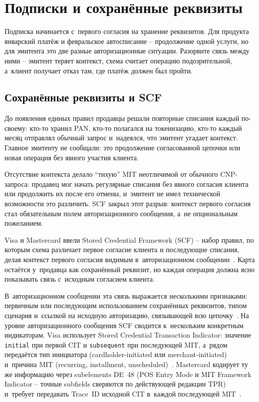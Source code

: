 
\chapter{Подписки и сохранённые реквизиты}\label{ch:subscriptions}
Подписка начинается с~первого согласия на хранение реквизитов. Для
продукта январский платёж и февральское автосписание -- продолжение
одной услуги, но для эмитента это две разные авторизационные
ситуации. Разорвите связь между ними -- эмитент теряет контекст,
схема считает операцию подозрительной, а~клиент получает отказ там,
где платёж должен был пройти.

\section{Сохранённые реквизиты и SCF}\label{sec:subscriptions-scf}

До появления единых правил продавцы решали повторные списания каждый
по-своему: кто-то хранил PAN, кто-то полагался на токенизацию, кто-то
каждый месяц отправлял обычный запрос и~надеялся, что эмитент угадает
контекст. Главное эмитенту не сообщали: это продолжение согласованной
цепочки или новая операция без явного участия клиента.

Отсутствие контекста делало \enquote{тихую} MIT неотличимой от обычного
CNP-запроса: продавец мог начать регулярные списания без явного
согласия клиента или продолжить их после его отмены, и~эмитент
не имел технической возможности это различить. SCF закрыл этот
разрыв: контекст первого согласия стал обязательным полем
авторизационного сообщения, а~не опциональным пожеланием.

Visa и Mastercard ввели Stored Credential Framework (SCF) -- набор
правил, по которым схема различает первое согласие клиента
и последующие списания, делая контекст первого согласия видимым
в~авторизационном сообщении~\cite{visa-scf,mc-scf}. Карта остаётся
у~продавца как сохранённый реквизит, но каждая операция должна
ясно показывать связь с~исходным согласием клиента.

В~авторизационном сообщении эта связь выражается несколькими
признаками: первичным или последующим использованием сохранённых
реквизитов, типом сценария и~ссылкой на исходную авторизацию, связывающей
всю цепочку~\cite{mc-tpr,cybs-initial-transactions}.
На уровне авторизационного сообщения SCF сводится к~нескольким
конкретным индикаторам. Visa использует Stored Credential
Transaction Indicator: значение \texttt{initial} при первой
CIT и \texttt{subsequent} при последующей MIT, а~рядом передаётся
тип инициатора (cardholder-initiated или merchant-initiated)
и~причина MIT (recurring, installment,
unscheduled)~\cite{visa-scf,cybs-initial-transactions}. Mastercard
кодирует ту же информацию через subelements DE~48 (POS Entry
Mode и MIT Framework Indicator -- точные subfields сверяются
по действующей редакции TPR) и~требует передавать Trace~ID
исходной CIT в~каждой последующей MIT~\cite{mc-scf,mc-tpr}.

